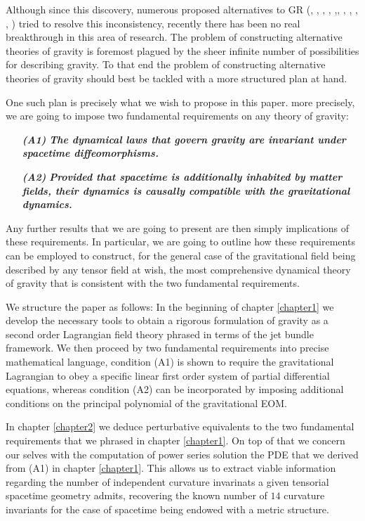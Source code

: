 \documentclass[%
 reprint,
nofootinbib,
 amsmath,amssymb,
 aps,
 prd,
floatfix,
]{revtex4-2}
\begin{document}
Although since this discovery, numerous proposed alternatives to GR (\cite{Scalar1}, \cite{Scalar2}, \cite{ST1}, \cite{ST2}, \cite{ST3},\cite{SVT1}, \cite{SVT2}, \cite{fR1}, \cite{fR2}, \cite{BIM1}, \cite{BIM2}) tried to resolve this inconsistency, recently there has been no real breakthrough in this area of research. The problem of constructing alternative theories of gravity is foremost plagued by the sheer infinite number of possibilities for describing gravity.  To that end the problem of constructing alternative theories of gravity should best be tackled with a more structured plan at hand.

One such plan is precisely what we wish to propose in this paper. more precisely, we are going to impose two fundamental requirements on any theory of gravity: 

\begin{samepage}
\begin{itemize}
    \item[\textbf{\textit{(A1)}}] \textbf{\textit{The dynamical laws that govern gravity are invariant under spacetime diffeomorphisms.}}
    \item[\textbf{\textit{(A2)}}] \textbf{\textit{Provided that spacetime is additionally inhabited by matter fields, their dynamics is causally compatible with the gravitational dynamics.}}
\end{itemize}
\end{samepage}

Any further results that we are going to present are then simply implications of these requirements. In particular, we are going to outline how these requirements can be employed to construct, for the general case of the gravitational field being described by any tensor field at wish, the most comprehensive dynamical theory of gravity that is consistent with the two fundamental requirements. 

We structure the paper as follows: 
In the beginning of chapter \ref{chapter1} we develop the necessary tools to obtain a rigorous formulation of gravity as a second order Lagrangian field theory phrased in terms of the jet bundle framework. We then proceed by  two fundamental requirements into precise mathematical language, condition (A1) is shown to require the gravitational Lagrangian to obey a specific linear first order system of partial differential equations, whereas condition (A2) can be incorporated by imposing additional conditions on the principal polynomial of the gravitational EOM. 

In chapter \ref{chapter2} we deduce perturbative equivalents to the two fundamental requirements that we phrased in chapter \ref{chapter1}. On top of that we concern our selves with the computation of power series solution the PDE that we derived from (A1) in chapter \ref{chapter1}. This allows us to extract viable information regarding the number of independent curvature invarinats a given tensorial spacetime geometry admits, recovering the known number of $14$ curvature invariants for the case of spacetime being endowed with a metric structure. 
\end{document}
